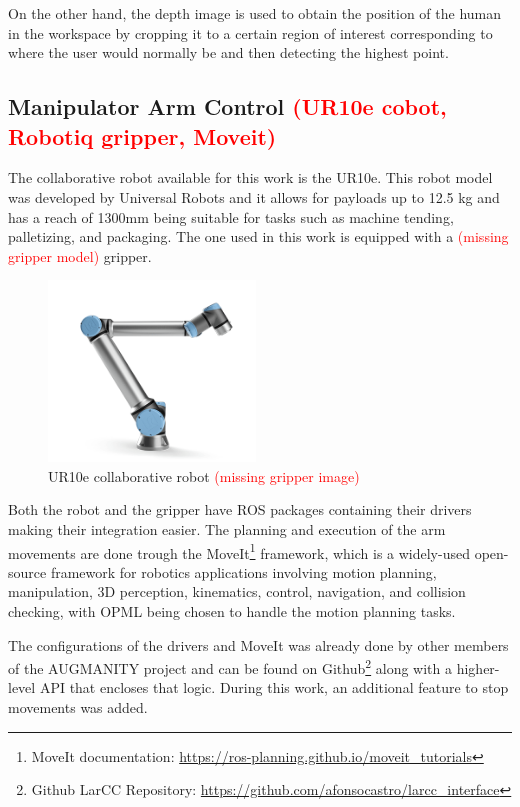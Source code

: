 On the other hand, the depth image is used to obtain the position of the human in the workspace by cropping it to a certain region of interest corresponding to where the user would normally be and then detecting the highest point.

\subsection{Manipulator Arm Control \textcolor{red}{(UR10e cobot, Robotiq gripper, Moveit)}}
\label{subsection:manipulator_arm_control}

The collaborative robot available for this work is the UR10e. This robot model was developed by Universal Robots and it allows for payloads up to 12.5 kg and has a reach of 1300mm being suitable for tasks such as machine tending, palletizing, and packaging\cite{UR10e}. The one used in this work is equipped with a \textcolor{red}{(missing gripper model)} gripper.

\begin{figure}[h]
\centerline{\includegraphics[width=0.49\textwidth]{figs/UR10e.png}}
\caption[UR10e]{UR10e collaborative robot \cite{UR10e_image} \textcolor{red}{(missing gripper image)}}
\label{fig:ur10e}
\end{figure}

Both the robot and the gripper have ROS packages containing their drivers making their integration easier. The planning and execution of the arm movements are done trough the MoveIt\footnote{MoveIt documentation: \url{https://ros-planning.github.io/moveit_tutorials}} framework, which is a widely-used open-source framework for robotics applications involving motion planning, manipulation, 3D perception, kinematics, control, navigation, and collision checking, with OPML being chosen to handle the motion planning tasks.

The configurations of the drivers and MoveIt was already done by other members of the AUGMANITY project and can be found on Github\footnote{Github LarCC Repository: \url{https://github.com/afonsocastro/larcc_interface}} along with a higher-level API that encloses that logic. During this work, an additional feature to stop movements was added.

